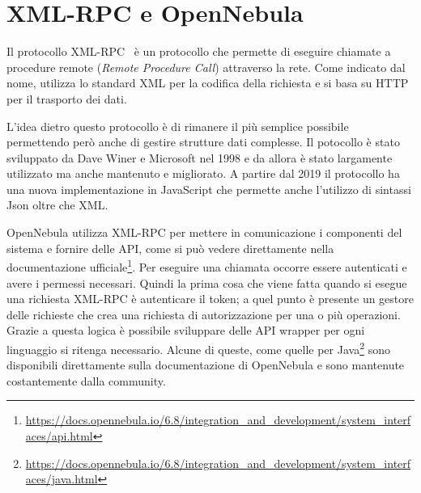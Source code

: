 \section{XML-RPC e OpenNebula}
Il protocollo XML-RPC~\cite{xmlrpc} è un protocollo che permette di eseguire chiamate a procedure remote (\emph{Remote Procedure Call}) attraverso la rete. Come indicato dal nome, utilizza lo standard XML per la codifica della richiesta e si basa su HTTP per il trasporto dei dati.\par
L'idea dietro questo protocollo è di rimanere il più semplice possibile permettendo però anche di gestire strutture dati complesse. Il potocollo è stato sviluppato da Dave Winer e Microsoft nel 1998 e da allora è stato largamente utilizzato ma anche mantenuto e migliorato.
A partire dal 2019 il protocollo ha una nuova implementazione in JavaScript che permette anche l'utilizzo di sintassi Json oltre che XML.\par
OpenNebula utilizza XML-RPC per mettere in comunicazione i componenti del sistema e fornire delle API, come si può vedere direttamente nella documentazione ufficiale\footnote{\url{https://docs.opennebula.io/6.8/integration\_and\_development/system\_interfaces/api.html}}. Per eseguire una chiamata occorre essere autenticati e avere i permessi necessari. Quindi la prima cosa che viene fatta quando si esegue una richiesta XML-RPC è autenticare il token; a quel punto è presente un gestore delle richieste che crea una richiesta di autorizzazione per una o più operazioni. Grazie a questa logica è possibile sviluppare delle API wrapper per ogni linguaggio si ritenga necessario. Alcune di queste, come quelle per Java\footnote{\url{https://docs.opennebula.io/6.8/integration\_and\_development/system\_interfaces/java.html}} sono disponibili direttamente sulla documentazione di OpenNebula e sono mantenute costantemente dalla community.